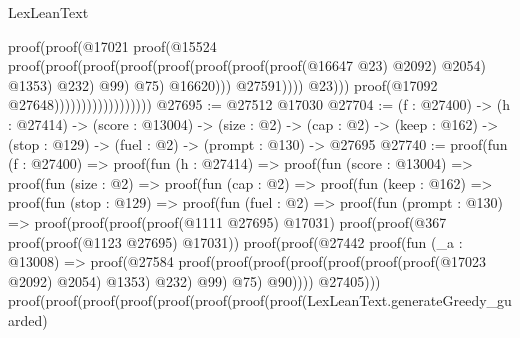 \begin{lexlean}{LexLeanText}
\begin{coremodule}
                                                          proof(proof(@17021
                                                                proof(@15524
                                                                    proof(proof(proof(proof(proof(proof(proof(proof(@16647
                                                                                      @23)
                                                                                    @2092)
                                                                                  @2054)
                                                                                @1353)
                                                                              @232)
                                                                            @99)
                                                                          @75)
                                                                        @16620)))
                                                              @27591))))
                                                    @23)))
                                          proof(@17092 @27648))))))))))))))))))
@27695 := @27512 @17030
@27704 := (f : @27400) ->
  (h : @27414) ->
  (score : @13004) ->
  (size : @2) ->
  (cap : @2) -> (keep : @162) -> (stop : @129) -> (fuel : @2) -> (prompt : @130) -> @27695
@27740 := proof(fun (f : @27400) =>
    proof(fun (h : @27414) =>
      proof(fun (score : @13004) =>
        proof(fun (size : @2) =>
          proof(fun (cap : @2) =>
            proof(fun (keep : @162) =>
              proof(fun (stop : @129) =>
                proof(fun (fuel : @2) =>
                  proof(fun (prompt : @130) =>
                    proof(proof(proof(proof(@1111 @27695) @17031)
                          proof(proof(@367 proof(proof(@1123 @27695) @17031))
                              proof(proof(@27442
                                    proof(fun (_a : @13008) =>
                                      proof(@27584
                                          proof(proof(proof(proof(proof(proof(proof(@17023 @2092)
                                                        @2054)
                                                      @1353)
                                                    @232)
                                                  @99)
                                                @75)
                                              @90))))
                                  @27405)))
                        proof(proof(proof(proof(proof(proof(proof(proof(LexLeanText.generateGreedy_guarded)

\end{coremodule}
\end{lexlean}
